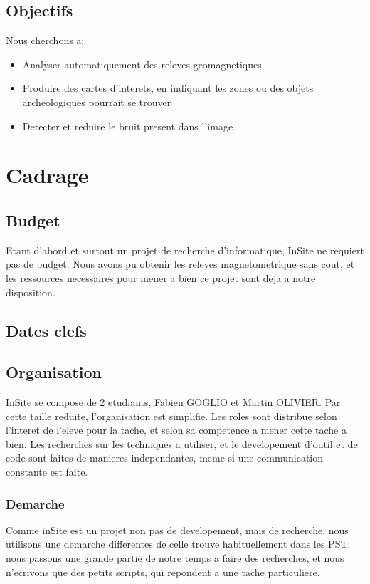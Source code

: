 \documentclass[a4paper, 12pt, titlepage, oneside]{article}
\begin{document}
	\subsection{Objectifs}
	Nous cherchons a:
	\begin{itemize}
		\item Analyser automatiquement des releves geomagnetiques 
		\item Produire des cartes d'interets, en indiquant les zones ou des objets archeologiques pourrait se trouver
		\item Detecter et reduire le bruit present dans l'image
	\end{itemize}

	\newpage

\section{Cadrage}
	\subsection{Budget}
	Etant d'abord et surtout un projet de recherche d'informatique, InSite ne requiert pas de budget. Nous avons pu obtenir les releves magnetometrique sans cout, et les ressources necessaires pour mener a bien ce projet sont deja a notre disposition. 
	\subsection{Dates clefs}
	\subsection{Organisation}
	InSite se compose de 2 etudiants, Fabien GOGLIO et Martin OLIVIER. Par cette taille reduite, l'organisation est simplifie. Les roles sont distribue selon l'interet de l'eleve pour la tache, et selon sa competence a mener cette tache a bien. Les recherches sur les techniques a utiliser, et le developement d'outil et de code sont faites de manieres independantes, meme si une communication constante est faite. 
	\subsubsection{Demarche}
	Comme inSite est un projet non pas de developement, mais de recherche, nous utilisons une demarche differentes de celle trouve habituellement dans les PST: nous passons une grande partie de notre temps a faire des recherches, et nous n'ecrivons que des petits scripts, qui repondent a une tache particuliere.   
\end{document}
